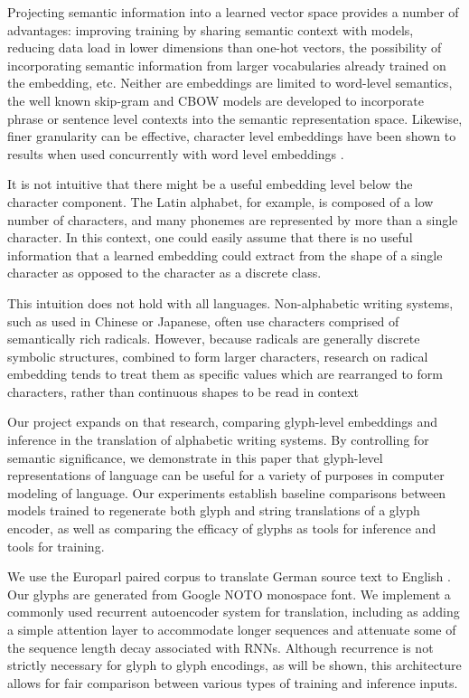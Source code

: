 \documentclass{article}
\begin{document}
Projecting semantic information into a learned vector space provides a number of advantages: improving training by sharing semantic context with models, reducing data load in lower dimensions than one-hot vectors, the possibility of incorporating semantic information from larger vocabularies already trained on the embedding, etc. Neither are embeddings are limited to word-level semantics, the well known skip-gram and CBOW models are developed to incorporate phrase or sentence level contexts into the semantic representation space. Likewise, finer granularity can be effective, character level embeddings have been shown to results when used concurrently with word level embeddings \cite{yinmultigran2016}.

It is not intuitive that there might be a useful embedding level below the character component. The Latin alphabet, for example, is composed of a low number of characters, and many phonemes are represented by more than a single character. In this context, one could easily assume that there is no useful information that a learned embedding could extract from the shape of a single character as opposed to the character as a discrete class.

This intuition does not hold with all languages. Non-alphabetic writing systems, such as used in Chinese or Japanese, often use characters comprised of semantically rich radicals. However, because radicals are generally discrete symbolic structures, combined to form larger characters, research on radical embedding tends to treat them as specific values which are rearranged to form characters, rather than continuous shapes to be read in context \cite{yinmultigran2016, jpcn2017glyph} 

Our project expands on that research, comparing glyph-level embeddings and inference in the translation of alphabetic writing systems. By controlling for semantic significance, we demonstrate in this paper that glyph-level representations of language can be useful for a variety of purposes in computer modeling of language. Our experiments establish baseline comparisons between models trained to regenerate both glyph and string translations of a glyph encoder, as well as comparing the efficacy of glyphs as tools for inference and tools for training. 

We use the Europarl paired corpus to translate German source text to English \cite{euro}. Our glyphs are generated from Google NOTO monospace font. We implement a commonly used recurrent autoencoder system for translation, including as adding a simple attention layer to accommodate longer sequences and attenuate some of the sequence length decay associated with RNNs. Although recurrence is not strictly necessary for glyph to glyph encodings, as will be shown, this architecture allows for fair comparison between various types of training and inference inputs. 
\end{document}

